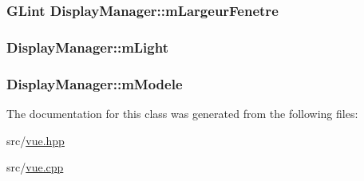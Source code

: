 \subsubsection[{\texorpdfstring{m\+Largeur\+Fenetre}{mLargeurFenetre}}]{\setlength{\rightskip}{0pt plus 5cm}G\+Lint Display\+Manager\+::m\+Largeur\+Fenetre}\hypertarget{class_display_manager_a7078a2a1023ebe660ce2e3007a988a62}{}\label{class_display_manager_a7078a2a1023ebe660ce2e3007a988a62}
\subsubsection[{\texorpdfstring{m\+Light}{mLight}}]{ Display\+Manager\+::m\+Light}\hypertarget{class_display_manager_a012e14f7761f19a3d049aae93f5d694b}{}\label{class_display_manager_a012e14f7761f19a3d049aae93f5d694b}
\subsubsection[{\texorpdfstring{m\+Modele}{mModele}}]{ Display\+Manager\+::m\+Modele}\hypertarget{class_display_manager_a0c8ba3fe8aece87fc924847fc8958398}{}\label{class_display_manager_a0c8ba3fe8aece87fc924847fc8958398}


The documentation for this class was generated from the following files\+:\begin{DoxyCompactItemize}
\item 
src/\hyperlink{vue_8hpp}{vue.\+hpp}\item 
src/\hyperlink{vue_8cpp}{vue.\+cpp}\end{DoxyCompactItemize}
